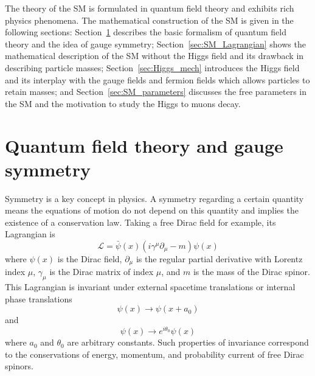The theory of the SM is formulated in quantum field theory and exhibits rich physics phenomena.
The mathematical construction of the SM is given in the following sections:
Section~\ref{sec:gauge_symmetry} describes the basic formalism of quantum field theory and the idea of gauge symmetry;
Section~\ref{sec:SM_Lagrangian} shows the mathematical description of the SM without the Higgs field and its drawback in describing particle masses;
Section~\ref{sec:Higgs_mech} introduces the Higgs field and its interplay with the gauge fields and fermion fields which allows particles to retain masses;
and Section~\ref{sec:SM_parameters} discusses the free parameters in the SM and the motivation to study the Higgs to muons decay.


\section{Quantum field theory and gauge symmetry}\label{sec:gauge_symmetry}

Symmetry is a key concept in physics. 
A symmetry regarding a certain quantity means the equations of motion do not depend on this quantity
and implies the existence of a conservation law.
Taking a free Dirac field for example, its Lagrangian is 
\begin{equation}\label{eq:Dirac_Lagrangian}
    \mathcal{L} = \bar{\psi}(x)(i\gamma^{\mu}\partial_{\mu}-m)\psi(x)
\end{equation}
where $\psi(x)$ is the Dirac field,
$\partial_{\mu}$ is the regular partial derivative with Lorentz index $\mu$,
$\gamma_{\mu}$ is the Dirac matrix of index $\mu$,
and $m$ is the mass of the Dirac spinor.
This Lagrangian is invariant under external spacetime translations or internal phase translations
\begin{equation}\label{eq:global_space}
     \psi(x) \to \psi(x+a_{0})
\end{equation}
and 
\begin{equation}\label{eq:global_phase}
    \psi(x) \to e^{i\theta_{0}}\psi(x)
\end{equation}
where $a_{0}$ and $\theta_{0}$ are arbitrary constants.
Such properties of invariance correspond to the conservations of energy, momentum, and probability current of free Dirac spinors.

